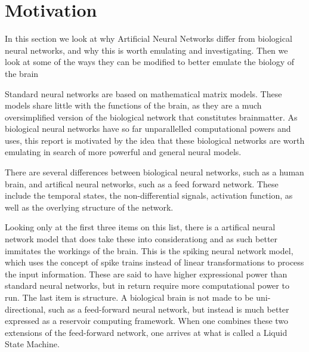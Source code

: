 \chapter{Motivation}

In this section we look at why Artificial Neural Networks differ from biological neural networks, and why this is worth emulating and investigating. Then we look at some of the ways they can be modified to better emulate the biology of the brain

Standard neural networks are based on mathematical matrix models. These models share little with the functions of the brain, as they are a much oversimplified version of the biological network that constitutes brainmatter.
As biological neural networks have so far unparallelled computational powers and uses, this report is motivated by the idea that these biological networks are worth emulating in search of more powerful and general neural models.

There are several differences between biological neural networks, such as a human brain, and artifical neural networks, such as a feed forward network. These include the temporal states, the non-differential signals, activation function, as well as the overlying structure of the network.

Looking only at the first three items on this list, there is a artifical neural network model that does take these into considerationg and as such better immitates the workings of the brain. This is the spiking neural network model, which uses the concept of spike trains instead of linear transformations to process the input information. These are said to have higher expressional power than standard neural networks, but in return require more computational power to run.
The last item is structure. A biological brain is not made to be uni-directional, such as a feed-forward neural network, but instead is much better expressed as a reservoir computing framework. When one combines these two extensions of the feed-forward network, one arrives at what is called a Liquid State Machine.